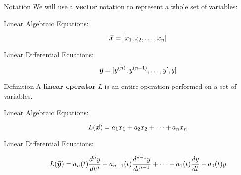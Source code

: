 \documentclass{beamer}
\begin{document}
\begin{frame}
\begin{block}{Notation}
We will use a \textbf{vector} notation to represent a whole set of variables:
\begin{description}
\item[Linear Algebraic Equations:] 
\begin{equation*}
{\vec{\boldsymbol{x}}}=[x_1, x_2, \ldots, x_n]
\end{equation*}
\item[Linear Differential Equations:] 
\begin{equation*}
{\vec{\boldsymbol{y}}}=[y^{(n)}, y^{(n-1)}, \ldots, y^\prime, y]
\end{equation*}
\end{description}
\end{block}\pause

\begin{block}{Definition}
A \textbf{linear operator} $L$ is an entire operation performed on a set of variables.
\begin{description}
\item[Linear Algebraic Equations:]
\begin{equation*}
L({\vec{\boldsymbol{x}}}) = a_1 x_1 + a_2 x_2 + \cdots + a_n x_n
\end{equation*}
\item[Linear Differential Equations:] 
\begin{equation*}
L({\vec{\boldsymbol{y}}})= a_n(t)\dfrac{d^n y}{dt^n}+a_{n-1}(t)\dfrac{d^{n-1} y}{dt^{n-1}}+\cdots+a_1(t)\dfrac{dy}{dt}+a_0(t)y
\end{equation*}
\end{description}
\end{block}
\end{frame}
\end{document}
